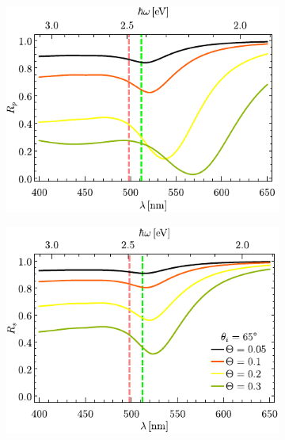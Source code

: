 \begin{figure}[h!]\centering\hspace*{-1.5em}
	\begin{subfigure}{.01\linewidth}\caption{}\label{sfig:Au-cutp}\vspace{4.5cm}\end{subfigure}
	\begin{subfigure}{.45\linewidth}\hspace*{-1.5em}
	\includegraphics[scale=1]{2-Resultados/figs/6-AuThetaVar/cut_angle_65_p.pdf}\end{subfigure}
	\begin{subfigure}{.01\linewidth}\caption{}\label{sfig:Au-cuts}\vspace{4.5cm}\end{subfigure}\hspace*{-1.em}
	\begin{subfigure}{.45\linewidth}\centering
	\includegraphics[scale=1 ]{2-Resultados/figs/6-AuThetaVar/cut_angle_65_s.pdf}\end{subfigure}\vspace*{0em}\\

\end{figure}
